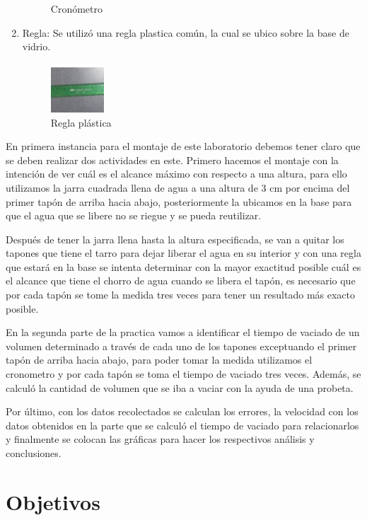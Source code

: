 \documentclass[journal,transmag]{IEEEtran}
\begin{document}
\begin{enumerate}
\begin{figure}[!h]
			\caption{Cronómetro}
			\label{4}
			\end{figure}
\item Regla: Se utilizó una regla plastica común, la cual se ubico sobre la base de vidrio.
		 \begin{figure}[!h]
		\center
		\includegraphics[width=2cm]{imagen5.png}
		\caption{Regla plástica}
		\label{5}
		\end{figure}

	\end{enumerate}
	En primera instancia para el montaje de este laboratorio debemos tener claro que se deben realizar dos actividades en este. Primero hacemos el montaje con la intención de ver cuál es el alcance máximo con respecto a una altura, para ello utilizamos la jarra cuadrada llena de agua a una altura de 3 cm por encima del primer tapón de arriba hacia abajo, posteriormente la ubicamos en la base para que el agua que se libere no se riegue y se pueda reutilizar. 

Después de tener la jarra llena hasta la altura especificada, se van a quitar los tapones que tiene el tarro para dejar liberar el agua en su interior y con una regla que estará en la base se intenta determinar con la mayor exactitud posible cuál es el alcance que tiene el chorro de agua cuando se libera el tapón, es necesario que por cada tapón se tome la medida tres veces para tener un resultado más exacto posible. 

En la segunda parte de la practica vamos a identificar el tiempo de vaciado de un volumen determinado a través de cada uno de los tapones exceptuando el primer tapón de arriba hacia abajo, para poder tomar la medida utilizamos el cronometro y por cada tapón se toma el tiempo de vaciado tres veces. Además, se calculó la cantidad de volumen que se iba a vaciar con la ayuda de una probeta. 

Por último, con los datos recolectados se calculan los errores, la velocidad con los datos obtenidos en la parte que se calculó el tiempo de vaciado para relacionarlos y finalmente se colocan las gráficas para hacer los respectivos análisis y conclusiones. 


\section{Objetivos}
\end{document}
